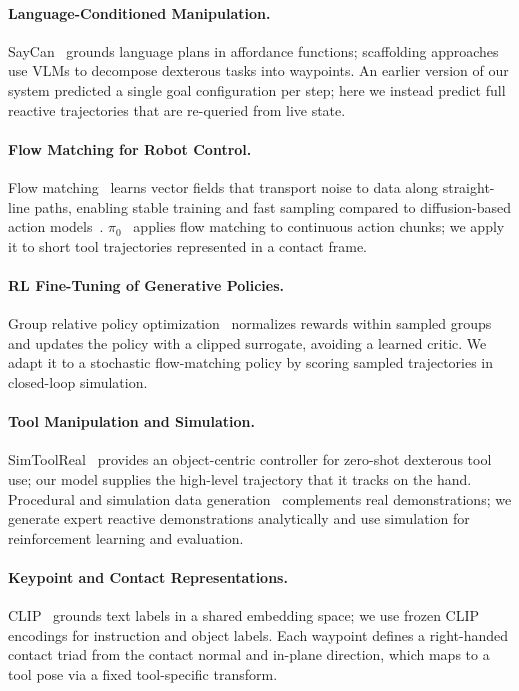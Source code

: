 \documentclass[11pt]{article}
\begin{document}
\paragraph{Language-Conditioned Manipulation.}
SayCan~\cite{saycan} grounds language plans in affordance functions; scaffolding approaches~\cite{scaffolding} use VLMs to decompose dexterous tasks into waypoints.
An earlier version of our system predicted a single goal configuration per step; here we instead predict full reactive trajectories that are re-queried from live state.

\paragraph{Flow Matching for Robot Control.}
Flow matching~\cite{flowmatching} learns vector fields that transport noise to data along straight-line paths, enabling stable training and fast sampling compared to diffusion-based action models~\cite{diffusionpolicy}.
$\pi_0$~\cite{pi0} applies flow matching to continuous action chunks; we apply it to short tool trajectories represented in a contact frame.

\paragraph{RL Fine-Tuning of Generative Policies.}
Group relative policy optimization~\cite{deepseekmath} normalizes rewards within sampled groups and updates the policy with a clipped surrogate, avoiding a learned critic.
We adapt it to a stochastic flow-matching policy by scoring sampled trajectories in closed-loop simulation.

\paragraph{Tool Manipulation and Simulation.}
SimToolReal~\cite{simtoolreal} provides an object-centric controller for zero-shot dexterous tool use; our model supplies the high-level trajectory that it tracks on the hand.
Procedural and simulation data generation~\cite{isaaclab,droid} complements real demonstrations; we generate expert reactive demonstrations analytically and use simulation for reinforcement learning and evaluation.

\paragraph{Keypoint and Contact Representations.}
CLIP~\cite{clip} grounds text labels in a shared embedding space; we use frozen CLIP encodings for instruction and object labels.
Each waypoint defines a right-handed contact triad from the contact normal and in-plane direction, which maps to a tool pose via a fixed tool-specific transform.
\end{document}
